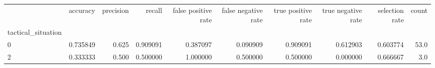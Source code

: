 \begin{tabular}{lrrrrrrrrr}
\toprule
{} &  accuracy &  precision &    recall &  false positive rate &  false negative rate &  true positive rate &  true negative rate &  selection rate &  count \\
tactical\_situation &           &            &           &                      &                      &                     &                     &                 &        \\
\midrule
0                  &  0.735849 &      0.625 &  0.909091 &             0.387097 &             0.090909 &            0.909091 &            0.612903 &        0.603774 &   53.0 \\
2                  &  0.333333 &      0.500 &  0.500000 &             1.000000 &             0.500000 &            0.500000 &            0.000000 &        0.666667 &    3.0 \\
\bottomrule
\end{tabular}
